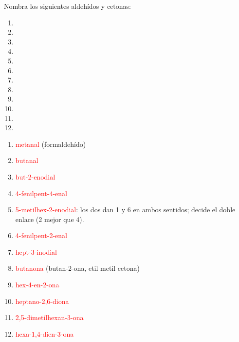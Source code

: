 \begin{exercise}
    Nombra los siguientes aldehídos y cetonas:
    \begin{enumerate}[label=\alph*)]
        \item {}
        \item {}
        \item {}
        \item {}
        \item {}
        \item {}
        \item {}
        \item {}
        \item {}
        \item {}
        \item {}
        \item {}
    \end{enumerate}
    \begin{solu}
        \begin{enumerate}[label=\alph*)]
            \item \textcolor{red}{metanal} (formaldehído)
            \item \textcolor{red}{butanal}
            \item \textcolor{red}{but-2-enodial}
            \item \textcolor{red}{4-fenilpent-4-enal}
            \item \textcolor{red}{5-metilhex-2-enodial}: los dos  dan 1 y 6 en ambos sentidos; decide el doble enlace (2 mejor que 4).
            \item \textcolor{red}{4-fenilpent-2-enal}
            \item \textcolor{red}{hept-3-inodial}
            \item \textcolor{red}{butanona} (butan-2-ona, etil metil cetona)
            \item \textcolor{red}{hex-4-en-2-ona}
            \item \textcolor{red}{heptano-2,6-diona}
            \item \textcolor{red}{2,5-dimetilhexan-3-ona}
            \item \textcolor{red}{hexa-1,4-dien-3-ona}
        \end{enumerate}
    \end{solu}
\end{exercise}


